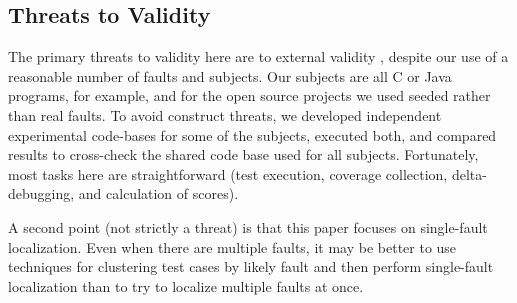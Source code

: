 \subsection{Threats to Validity}

The primary threats to validity here are to external validity
\cite{Threats}, despite our use of a reasonable number of faults and subjects.  Our subjects are all C or
Java programs, for example, and for the open source projects we used
seeded rather than real faults.  To avoid
construct threats, we developed independent experimental code-bases
for some of the subjects, executed both, and compared results to
cross-check the shared code base used for all subjects.  Fortunately,
most tasks here are straightforward (test execution, coverage
collection, delta-debugging, and calculation of scores).

A second point (not strictly a threat) is that this paper focuses on
single-fault localization.    Even when
there are multiple faults, it may be better to use techniques for
clustering test cases by likely fault 
\cite{Jones07,PLDI13,Podgurski03,Podgurski04} and then perform
single-fault localization than to try to localize multiple faults at
once.
